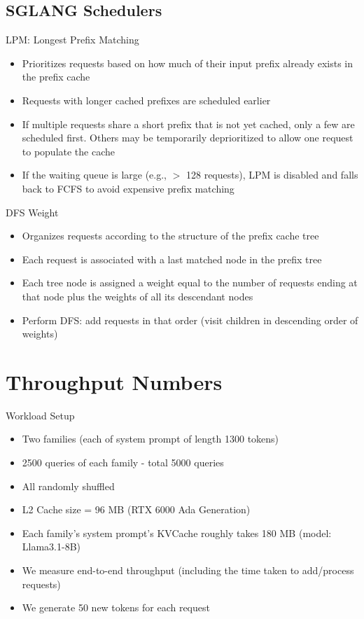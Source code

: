 \documentclass[Serif, 10pt, brown]{beamer}
\theoremstyle{example}
\theoremstyle{plain}
\begin{document}
\subsection{SGLANG Schedulers}
\begin{frame}{LPM: Longest Prefix Matching}
    \begin{itemize}
        \item Prioritizes requests based on how much of their input prefix already exists in the prefix cache
        \item Requests with longer cached prefixes are scheduled earlier
        \item If multiple requests share a short prefix that is not yet cached, only a few are scheduled first. Others may be temporarily deprioritized to allow one request to populate the cache
        \item If the waiting queue is large (e.g., $>$ 128 requests), LPM is disabled and falls back to FCFS to avoid expensive prefix matching
    \end{itemize}
\end{frame}

\begin{frame}{DFS Weight}
    \begin{itemize}
        \item Organizes requests according to the structure of the prefix cache tree
        \item Each request is associated with a last matched node in the prefix tree
        \item Each tree node is assigned a weight equal to the number of requests ending at that node plus the weights of all its descendant nodes
        \item Perform DFS: add requests in that order (visit children in descending order of weights)
    \end{itemize}
\end{frame}

\section{Throughput Numbers}
\begin{frame}{Workload Setup}
    \begin{itemize}
        \item Two families (each of system prompt of length 1300 tokens)
        \item 2500 queries of each family - total 5000 queries
        \item All randomly shuffled
        \item L2 Cache size = 96 MB (RTX 6000 Ada Generation)
        \item Each family's system prompt's KVCache roughly takes 180 MB (model: Llama3.1-8B)
        \item We measure end-to-end throughput (including the time taken to add/process requests)
        \item We generate 50 new tokens for each request
    \end{itemize} 
\end{frame}
\end{document}
